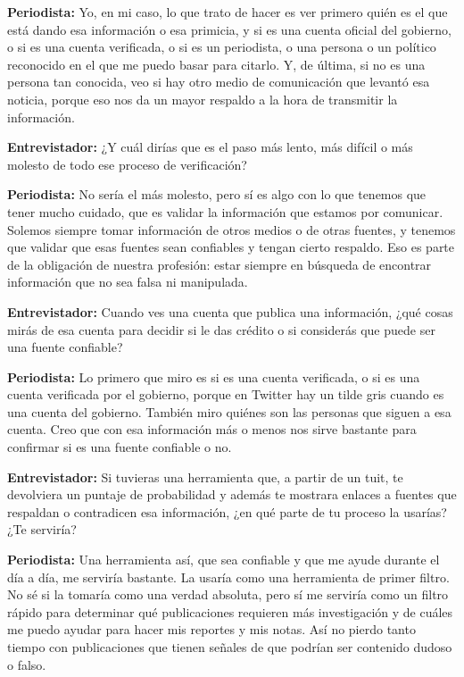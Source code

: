 \noindent\textbf{Periodista:} Yo, en mi caso, lo que trato de hacer es ver primero quién es el que está dando esa información o esa primicia, y si es una cuenta oficial del gobierno, o si es una cuenta verificada, o si es un periodista, o una persona o un político reconocido en el que me puedo basar para citarlo. Y, de última, si no es una persona tan conocida, veo si hay otro medio de comunicación que levantó esa noticia, porque eso nos da un mayor respaldo a la hora de transmitir la información.

\medskip

\noindent\textbf{Entrevistador:} ¿Y cuál dirías que es el paso más lento, más difícil o más molesto de todo ese proceso de verificación?

\noindent\textbf{Periodista:} No sería el más molesto, pero sí es algo con lo que tenemos que tener mucho cuidado, que es validar la información que estamos por comunicar. Solemos siempre tomar información de otros medios o de otras fuentes, y tenemos que validar que esas fuentes sean confiables y tengan cierto respaldo. Eso es parte de la obligación de nuestra profesión: estar siempre en búsqueda de encontrar información que no sea falsa ni manipulada.

\medskip

\noindent\textbf{Entrevistador:} Cuando ves una cuenta que publica una información, ¿qué cosas mirás de esa cuenta para decidir si le das crédito o si considerás que puede ser una fuente confiable?

\noindent\textbf{Periodista:} Lo primero que miro es si es una cuenta verificada, o si es una cuenta verificada por el gobierno, porque en Twitter hay un tilde gris cuando es una cuenta del gobierno. También miro quiénes son las personas que siguen a esa cuenta. Creo que con esa información más o menos nos sirve bastante para confirmar si es una fuente confiable o no.

\medskip

\noindent\textbf{Entrevistador:} Si tuvieras una herramienta que, a partir de un tuit, te devolviera un puntaje de probabilidad y además te mostrara enlaces a fuentes que respaldan o contradicen esa información, ¿en qué parte de tu proceso la usarías? ¿Te serviría?

\noindent\textbf{Periodista:} Una herramienta así, que sea confiable y que me ayude durante el día a día, me serviría bastante. La usaría como una herramienta de primer filtro. No sé si la tomaría como una verdad absoluta, pero sí me serviría como un filtro rápido para determinar qué publicaciones requieren más investigación y de cuáles me puedo ayudar para hacer mis reportes y mis notas. Así no pierdo tanto tiempo con publicaciones que tienen señales de que podrían ser contenido dudoso o falso.

